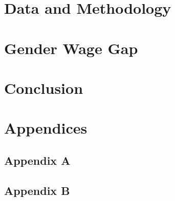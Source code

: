 \documentclass[12pt]{article}
\begin{document}
\section{Data and Methodology} \label{sec:methods1}


\section{Gender Wage Gap} \label{sec:methods2}


\section{Conclusion} \label{sec:conclusion}


% 

\clearpage
\onehalfspacing %

%
\printbibliography


\clearpage
\appendix
\section*{Appendices}
\renewcommand{\thesubsection}{\Alph{subsection}}
\renewcommand\thefigure{\thesubsection.\arabic{figure}}
\renewcommand{\thetable}{\thesubsection.\arabic{table}}

\subsection{Appendix A}\label{app-A}

\clearpage
\subsection{Appendix B}\label{app-B}



\newcommand*{\nolink}[1]{%
  {\protect\NoHyper#1\protect\endNoHyper}%
}
\end{document}
